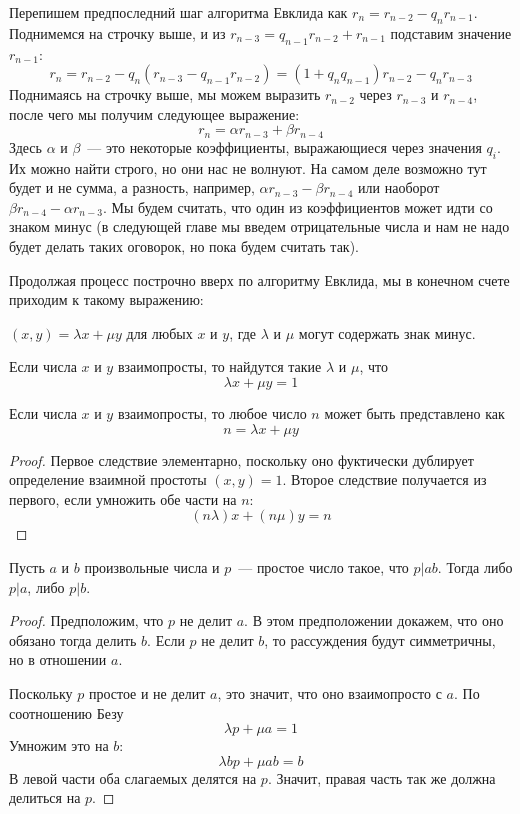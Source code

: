 Перепишем предпоследний шаг алгоритма Евклида как $r_n = r_{n-2} - q_n r_{n-1}$. Поднимемся на строчку выше, и из $r_{n-3} = q_{n-1} r_{n-2} + r_{n-1}$ подставим значение $r_{n-1}$:
$$r_n = r_{n-2} - q_n(r_{n-3} - q_{n-1}r_{n-2}) = (1+q_n q_{n-1})r_{n-2} - q_n r_{n-3}$$
Поднимаясь на строчку выше, мы можем выразить $r_{n-2}$ через $r_{n-3}$ и $r_{n-4}$, после чего мы получим следующее выражение:
$$r_n = \alpha r_{n-3} + \beta r_{n-4}$$
Здесь $\alpha$ и $\beta$~--- это некоторые коэффициенты, выражающиеся через значения $q_i$. Их можно найти строго, но они нас не волнуют. На самом деле возможно тут будет и не сумма, а разность, например, $\alpha r_{n-3} - \beta r_{n-4}$ или наоборот $\beta r_{n-4} - \alpha r_{n-3}$. Мы будем считать, что один из коэффициентов может идти со знаком минус (в следующей главе мы введем отрицательные числа и нам не надо будет делать таких оговорок, но пока будем считать так).

Продолжая процесс построчно вверх по алгоритму Евклида, мы в конечном счете приходим к такому выражению:

\begin{Bezus}
$(x, y) = \lambda x + \mu y$ для любых $x$ и $y$, где $\lambda$ и $\mu$ могут содержать знак минус.
\end{Bezus}
\begin{corollary}
Если числа $x$ и $y$ взаимопросты, то найдутся такие $\lambda$ и $\mu$, что
$$\lambda x + \mu y = 1$$
\end{corollary}
\begin{corollary}
Если числа $x$ и $y$ взаимопросты, то любое число $n$ может быть представлено как
$$n = \lambda x + \mu y$$
\end{corollary}
\begin{proof}
Первое следствие элементарно, поскольку оно фуктически дублирует определение взаимной простоты $(x, y) = 1$. Второе следствие получается из первого, если умножить обе части на $n$:
$$(n\lambda) x + (n\mu) y = n$$
\end{proof}

\begin{EuclidsLemma}
Пусть $a$ и $b$ произвольные числа и $p$~--- простое число такое, что $p|ab$. Тогда либо $p|a$, либо $p|b$.
\end{EuclidsLemma}
\begin{proof}
Предположим, что $p$ не делит $a$. В этом предположении докажем, что оно обязано тогда делить $b$. Если $p$ не делит $b$, то рассуждения будут симметричны, но в отношении $a$.

Поскольку $p$ простое и не делит $a$, это значит, что оно взаимопросто с $a$. По соотношению Безу
$$\lambda p + \mu a = 1$$
Умножим это на $b$:
$$ \lambda bp + \mu ab = b$$
В левой части оба слагаемых делятся на $p$. Значит, правая часть так же должна делиться на $p$.
\end{proof}

